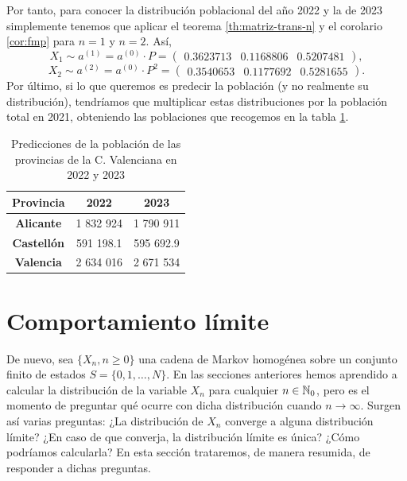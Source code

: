 \begin{ejemplo}
        
        Por tanto, para conocer la distribución poblacional del año 2022 y la de 2023 simplemente tenemos que aplicar el teorema \ref{th:matriz-trans-n} y el corolario \ref{cor:fmp} para $n=1$ y $n=2$. Así,
        \begin{equation*}
            X_1\sim a^{(1)} = a^{(0)}\cdot P = \begin{pmatrix}
                0.3623713 &
                0.1168806 &
                0.5207481
            \end{pmatrix},
        \end{equation*}
        \begin{equation*}
            X_2 \sim a^{(2)} = a^{(0)}\cdot P^2 = \begin{pmatrix}
                0.3540653 &
                0.1177692 &
                0.5281655
            \end{pmatrix}.
        \end{equation*}
        Por último, si lo que queremos es predecir la población (y no realmente su distribución), tendríamos que multiplicar estas distribuciones por la población total en 2021, obteniendo las poblaciones que recogemos en la tabla \ref{tab:predicciones}.

        \begin{table}[h]
            \centering
            \begin{tabular}{ccc}\hline
            \textbf{Provincia}          & \textbf{2022} & \textbf{2023} \\ \hline\hline
            \textbf{Alicante}   & 1 832 924   & 1 790 911     \\ \hline
            \textbf{Castellón} & 591 198.1     & 595 692.9    \\ \hline
            \textbf{Valencia}  & 2 634 016   & 2 671 534    \\ \hline
            \end{tabular}
            \caption{Predicciones de la población de las provincias de la C. Valenciana en 2022 y 2023}
            \label{tab:predicciones}
            \end{table}

\end{ejemplo}

\section{Comportamiento límite}

De nuevo, sea $\{X_n, n\geq 0\}$ una cadena de Markov homogénea sobre un conjunto finito de estados $S=\{0,1,\dots,N\}$. En las secciones anteriores hemos aprendido a calcular la distribución de la variable $X_n$ para cualquier $n\in\mathbb{N}_0$, pero es el momento de preguntar qué ocurre con dicha distribución cuando $n\rightarrow\infty$. Surgen así varias preguntas: ¿La distribución de $X_n$ converge a alguna distribución límite? ¿En caso de que converja, la distribución límite es única? ¿Cómo podríamos calcularla? En esta sección trataremos, de manera resumida, de responder a dichas preguntas.

